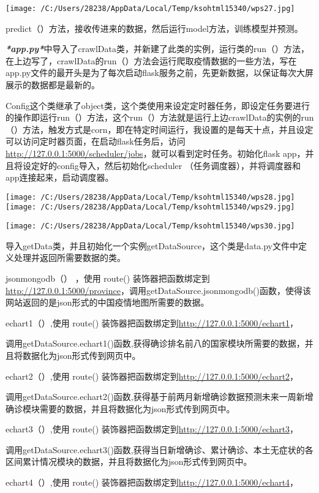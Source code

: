 \documentclass[
]{article}
\begin{document}
\texttt{[image: /C:/Users/28238/AppData/Local/Temp/ksohtml15340/wps27.jpg]}

predict（）方法，接收传进来的数据，然后运行model方法，训练模型并预测。

\emph{\textbf{*app.py*}}中导入了crawlData类，并新建了此类的实例，运行类的run（）方法，在上边写了，crawlData的run（）方法会运行爬取疫情数据的一些方法，写在app.py文件的最开头是为了每次启动flask服务之前，先更新数据，以保证每次大屏展示的数据都是最新的。

Config这个类继承了object类，这个类使用来设定定时器任务，即设定任务要进行的操作即运行run（）方法，这个run（）方法就是运行上边crawlData的实例的run（）方法，触发方式是corn，即在特定时间运行，我设置的是每天十点，并且设定可以访问定时器页面，在启动flask任务后，访问\url{http://127.0.0.1:5000/scheduler/jobs}，就可以看到定时任务。初始化flask
app，并且将设定好的config导入，然后初始化scheduler
（任务调度器），并将调度器和app连接起来，启动调度器。

\texttt{[image: /C:/Users/28238/AppData/Local/Temp/ksohtml15340/wps28.jpg]}
\texttt{[image: /C:/Users/28238/AppData/Local/Temp/ksohtml15340/wps29.jpg]}

\texttt{[image: /C:/Users/28238/AppData/Local/Temp/ksohtml15340/wps30.jpg]}

导入getData类，并且初始化一个实例getDataSource，这个类是data.py文件中定义处理并返回所需要数据的类。

jsonmongodb（） ，使用 route()
装饰器把函数绑定到\url{http://127.0.0.1:5000/province}，调用getDataSource.jsonmongodb()函数，使得该网站返回的是json形式的中国疫情地图所需要的数据。

echart1（）,使用 route()
装饰器把函数绑定到\url{http://127.0.0.1:5000/echart1}，

调用getDataSource.echart1()函数,获得确诊排名前八的国家模块所需要的数据，并且将数据化为json形式传到网页中。

echart2（）,使用 route()
装饰器把函数绑定到\url{http://127.0.0.1:5000/echart2}，

调用getDataSource.echart2()函数,获得基于前两月新增确诊数据预测未来一周新增确诊模块需要的数据，并且将数据化为json形式传到网页中。

echart3（）,使用 route()
装饰器把函数绑定到\url{http://127.0.0.1:5000/echart3}，

调用getDataSource.echart3()函数,获得当日新增确诊、累计确诊、本土无症状的各区间累计情况模块的数据，并且将数据化为json形式传到网页中。

echart4（）,使用 route()
装饰器把函数绑定到\url{http://127.0.0.1:5000/echart4}，
\end{document}
